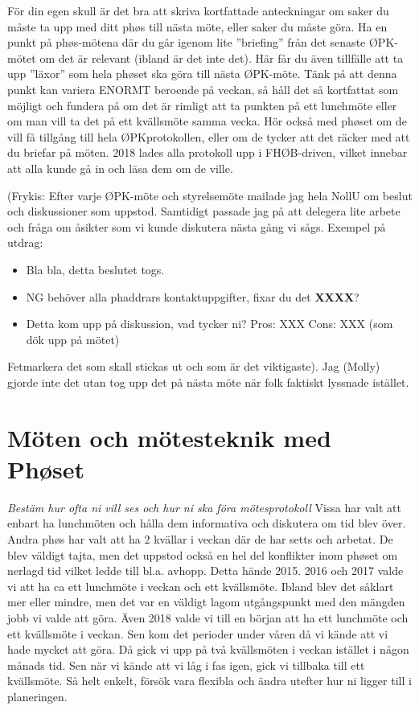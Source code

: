 \documentclass[10pt]{article}
\begin{document}
    För din egen skull är det bra att skriva kortfattade anteckningar om saker du måste ta upp med ditt phøs till nästa möte, eller saker du måste göra. Ha en punkt på phøs-mötena där du går igenom lite ”briefing” från det senaste ØPK-mötet om det är relevant (ibland är det inte det). Här får du även tillfälle att ta upp ”läxor” som hela phøset ska göra till nästa ØPK-möte. Tänk på att denna punkt kan variera ENORMT beroende på veckan, så håll det så kortfattat som möjligt och fundera på om det är rimligt att ta punkten på ett lunchmöte eller om man vill ta det på ett kvällsmöte samma vecka. Hör också med phøset om de vill få tillgång till hela ØPKprotokollen, eller om de tycker att det räcker med att du briefar på möten. 2018 lades alla protokoll upp i FHØB-driven, vilket innebar att alla kunde gå in och läsa dem om de ville. 

    (Frykis: Efter varje ØPK-möte och styrelsemöte mailade jag hela NollU om beslut och diskussioner som uppstod. Samtidigt passade jag på att delegera lite arbete och fråga om åsikter som vi kunde diskutera nästa gång vi sågs. Exempel på utdrag:
    \begin{itemize}
        \item Bla bla, detta beslutet togs.
        \item NG behöver alla phaddrars kontaktuppgifter, fixar du det \textbf{XXXX}?
        \item Detta kom upp på diskussion, vad tycker ni? Pros: XXX Cons: XXX (som dök upp på mötet)
    \end{itemize}

    Fetmarkera det som skall stickas ut och som är det viktigaste). Jag (Molly) gjorde inte det utan tog upp det på nästa möte när folk faktiskt lyssnade istället.

    \section{Möten och mötesteknik med Phøset}
    \textit{Bestäm hur ofta ni vill ses och hur ni ska föra mötesprotokoll} \newline
    Vissa har valt att enbart ha lunchmöten och hålla dem informativa och diskutera om tid blev över. Andra phøs har valt att ha 2 kvällar i veckan där de har setts och arbetat. De blev väldigt tajta, men det uppstod också en hel del konflikter inom phøset om nerlagd tid vilket ledde till bl.a. avhopp. Detta hände 2015. 2016 och 2017 valde vi att ha ca ett lunchmöte i veckan och ett kvällsmöte. Ibland blev det såklart mer eller mindre, men det var en väldigt lagom utgångspunkt med den mängden jobb vi valde att göra. \newline
    Även 2018 valde vi till en början att ha ett lunchmöte och ett kvällsmöte i veckan. Sen kom det perioder under våren då vi kände att vi hade mycket att göra. Då gick vi upp på två kvällsmöten i veckan istället i någon månads tid. Sen när vi kände att vi låg i fas igen, gick vi tillbaka till ett kvällsmöte. Så helt enkelt, försök vara flexibla och ändra utefter hur ni ligger till i planeringen.
\end{document}

